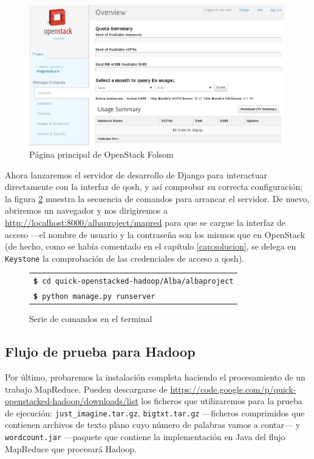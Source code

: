 \begin{figure}[tbp]
\begin{center}
\includegraphics[width=0.99\textwidth]{imagenes/045.png}
\caption{P\'agina principal de OpenStack Folsom}
\label{fig:homeos}
\end{center}
\end{figure}

Ahora lanzaremos el servidor de desarrollo de Django para interactuar directamente con la interfaz de qosh, y as\'i comprobar su correcta configuraci\'on; la figura \ref{fig:comandosshell2} muestra la secuencia de comandos para arrancar el servidor. De nuevo, abriremos un navegador y nos dirigiremos a \url{http://localhost:8000/albaproject/mapred} para que se cargue la interfaz de acceso ---el nombre de usuario y la contrase\~na son los mismos que en OpenStack (de hecho, como se hab\'ia comentado en el cap\'itulo \ref{cap:solucion}, se delega en \texttt{Keystone} la comprobaci\'on de las credenciales de acceso a qosh).

\begin{figure}[tbp]
    \begin{center}
        \begin{tabular}{|l|}
            \hline
            \texttt{{\bf \$} cd quick-openstacked-hadoop/Alba/albaproject} \\
            \texttt{{\bf \$} python manage.py runserver} \\
            \hline
        \end{tabular}
        \caption{Serie de comandos en el terminal}
        \label{fig:comandosshell2}
    \end{center}
\end{figure}

\subsection{Flujo de prueba para Hadoop}\label{subsec:flujohadoop}
\noindent Por \'ultimo, probaremos la instalaci\'on completa haciendo el procesamiento de un trabajo MapReduce. Pueden descargarse de \url{https://code.google.com/p/quick-openstacked-hadoop/downloads/list} los ficheros que utilizaremos para la prueba de ejecuci\'on: \texttt{just\_imagine.tar.gz}, \texttt{bigtxt.tar.gz} ---ficheros comprimidos que contienen archivos de texto plano cuyo n\'umero de palabras vamos a contar--- y \texttt{wordcount.jar} ---paquete que contiene la implementaci\'on en Java del flujo MapReduce que procesar\'a Hadoop. \newline

